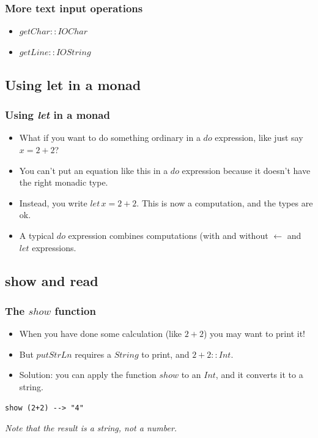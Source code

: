 \documentclass{beamer}
\begin{document}
\begin{frame}[fragile]
\frametitle{More text input operations}

\begin{itemize}
\item $getChar :: IO Char$
\item $getLine :: IO String$
\end{itemize}

\end{frame}



\subsection{Using let  in a monad}
\begin{frame}[fragile]
\frametitle{Using \emph{let} in a monad}

\begin{itemize}
\item What if you want to do something ordinary in a $do$
  expression, like just say $x = 2+2$?
\item You can't put an equation like this in a $do$ expression
  because it doesn't have the right monadic type.
\item Instead, you write $let\, x = 2+2$.  This is now a computation,
  and the types are ok.
\item A typical $do$ expression combines computations (with and
  without $\leftarrow$ and $let$ expressions.
\end{itemize}

\end{frame}

\subsection{show and read}

\begin{frame}[fragile]
\frametitle{The $show$ function}

\begin{itemize}
\item When you have done some calculation (like $2+2$) you may want
  to print it!
\item But $putStrLn$ requires a $String$ to print, and $2+2 :: Int$.
\item Solution: you can apply the function $show$ to an $Int$, and
  it converts it to a string.
\end{itemize}

\begin{verbatim}
show (2+2) --> "4"
\end{verbatim}

\emph{Note that the result is a string, not a number.}

\end{frame}
\end{document}
